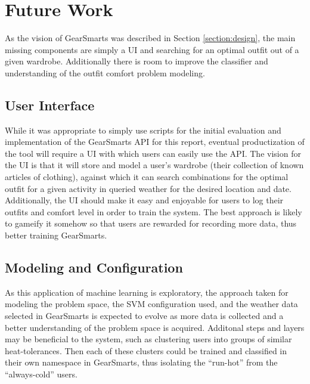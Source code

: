 \section{Future Work}
\label{section:futurework}
As the vision of GearSmarts was described in Section \ref{section:design}, the main missing components are simply a UI
and searching for an optimal outfit out of a given wardrobe. Additionally there is room to improve the classifier and
understanding of the outfit comfort problem modeling.

\subsection{User Interface}
\label{section:ui}
While it was appropriate to simply use scripts for the initial evaluation and implementation of the GearSmarts API for
this report, eventual productization of the tool will require a UI with which users can easily use the API. The vision
for the UI is that it will store and model a user's wardrobe (their collection of known articles of clothing), against
which it can search combinations for the optimal outfit for a given activity in queried weather for the desired location
and date. Additionally, the UI should make it easy and enjoyable for users to log their outfits and comfort level in order
to train the system. The best approach is likely to gameify it somehow so that users are rewarded for recording more
data, thus better training GearSmarts.

\subsection{Modeling and Configuration}
\label{section:modelingandconfig}
As this application of machine learning is exploratory, the approach taken for modeling the problem space, the
SVM configuration used, and the weather data selected in GearSmarts is expected to evolve as more data is collected and
a better understanding of the problem space is acquired. Additonal steps and layers may be beneficial to the system, such
as clustering users into groups of similar heat-tolerances. Then each of these clusters could be trained and classified in
their own namespace in GearSmarts, thus isolating the ``run-hot'' from the ``always-cold'' users.